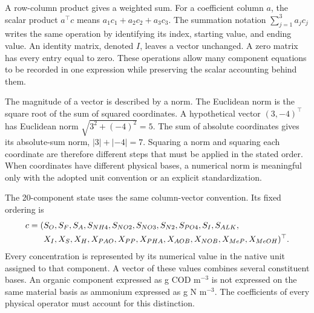 A row-column product gives a weighted sum. For a coefficient column $a$, the scalar product $a^\top c$ means $a_1c_1+a_2c_2+a_3c_3$. The summation notation $\sum_{j=1}^3a_jc_j$ writes the same operation by identifying its index, starting value, and ending value. An identity matrix, denoted $I$, leaves a vector unchanged. A zero matrix has every entry equal to zero. These operations allow many component equations to be recorded in one expression while preserving the scalar accounting behind them.

The magnitude of a vector is described by a norm. The Euclidean norm is the square root of the sum of squared coordinates. A hypothetical vector $(3,-4)^\top$ has Euclidean norm $\sqrt{3^2+(-4)^2}=5$. The sum of absolute coordinates gives its absolute-sum norm, $|3|+|-4|=7$. Squaring a norm and squaring each coordinate are therefore different steps that must be applied in the stated order. When coordinates have different physical bases, a numerical norm is meaningful only with the adopted unit convention or an explicit standardization.

The 20-component state uses the same column-vector convention. Its fixed ordering is
\begin{equation}
\equationname{Fixed ordering of the twenty component concentrations}
\begin{split}
c=(&S_O,S_F,S_A,S_{NH4},S_{NO2},S_{NO3},S_{N2},S_{PO4},S_I,S_{ALK},\\
&X_I,X_S,X_H,X_{PAO},X_{PP},X_{PHA},X_{AOB},X_{NOB},X_{MeP},X_{MeOH})^\top.
\end{split}
\label{eq:component_order}
\end{equation}
Every concentration is represented by its numerical value in the native unit assigned to that component. A vector of these values combines several constituent bases. An organic component expressed as g COD m$^{-3}$ is not expressed on the same material basis as ammonium expressed as g N m$^{-3}$. The coefficients of every physical operator must account for this distinction.


